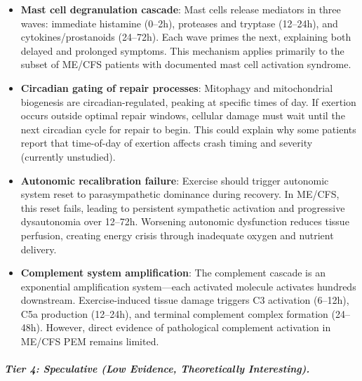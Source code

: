 \begin{itemize}
    \item \textbf{Mast cell degranulation cascade}: Mast cells release mediators in three waves: immediate histamine (0--2h), proteases and tryptase (12--24h), and cytokines/prostanoids (24--72h). Each wave primes the next, explaining both delayed and prolonged symptoms. This mechanism applies primarily to the subset of ME/CFS patients with documented mast cell activation syndrome.

    \item \textbf{Circadian gating of repair processes}: Mitophagy and mitochondrial biogenesis are circadian-regulated, peaking at specific times of day. If exertion occurs outside optimal repair windows, cellular damage must wait until the next circadian cycle for repair to begin. This could explain why some patients report that time-of-day of exertion affects crash timing and severity (currently unstudied).

    \item \textbf{Autonomic recalibration failure}: Exercise should trigger autonomic system reset to parasympathetic dominance during recovery. In ME/CFS, this reset fails, leading to persistent sympathetic activation and progressive dysautonomia over 12--72h. Worsening autonomic dysfunction reduces tissue perfusion, creating energy crisis through inadequate oxygen and nutrient delivery.

    \item \textbf{Complement system amplification}: The complement cascade is an exponential amplification system---each activated molecule activates hundreds downstream. Exercise-induced tissue damage triggers C3 activation (6--12h), C5a production (12--24h), and terminal complement complex formation (24--48h). However, direct evidence of pathological complement activation in ME/CFS PEM remains limited.
\end{itemize}

\subparagraph{Tier 4: Speculative (Low Evidence, Theoretically Interesting).}

